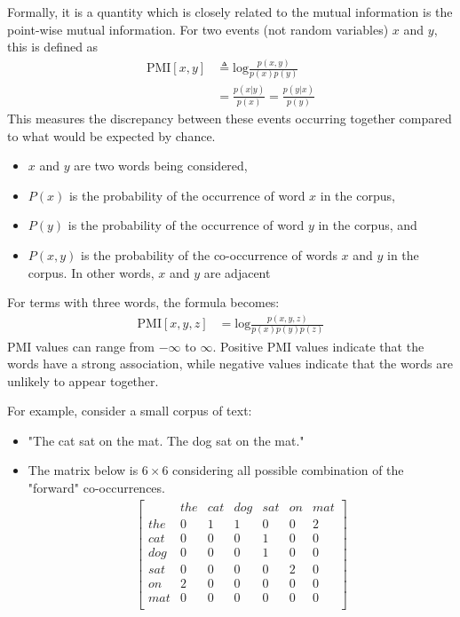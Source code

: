 Formally, it is a quantity which is closely related to the mutual information is the point-wise mutual information. For two events (not random variables) $x$ and $y$, this is defined as
\begin{align}
	\textrm{PMI}[x,y] &\triangleq \textrm{log}\frac{p(x, y)}{p(x)p(y)}\\
					 &= \frac{p(x|y)}{p(x)}=\frac{p(y|x)}{p(y)}
	\label{eq:pmi}
\end{align}
This measures the discrepancy between these events occurring together compared to what would be expected by chance. 

\begin{itemize}
	\item $x$ and $y$ are two words being considered,
	\item $P(x)$ is the probability of the occurrence of word $x$ in the corpus,
	\item $P(y)$ is the probability of the occurrence of word $y$ in the corpus, and
	\item $P(x,y)$ is the probability of the co-occurrence of words $x$ and $y$ in the corpus. In other words, $x$ and $y$ are adjacent
\end{itemize}

For terms with three words, the formula becomes:
\begin{align*}
	\textrm{PMI}[x,y,z] &= \textrm{log}\frac{p(x, y, z)}{p(x)p(y)p(z)}
\end{align*}
PMI values can range from $-\infty$ to $\infty$. Positive PMI values indicate that the words have a strong association, while negative values indicate that the words are unlikely to appear together.

For example, consider a small corpus of text:
\begin{itemize}
	\item "The cat sat on the mat. The dog sat on the mat."
	\item The matrix below is $6\times 6$ considering all possible combination of the "forward" co-occurrences.
	\begin{align*}
		\begin{bmatrix}
		&the &cat &dog &sat &on  &mat\\
		the & 0  &1   &1   &0   &0   &2\\
		cat & 0  &0   &0   &1   &0   &0\\
		dog & 0  &0   &0   &1   &0   &0\\
		sat & 0  &0   &0   &0   &2   &0\\
		on  & 2  &0   &0   &0   &0   &0\\
		mat & 0  &0   &0   &0   &0   &0\\
		\end{bmatrix}
	\end{align*}
\end{itemize}


